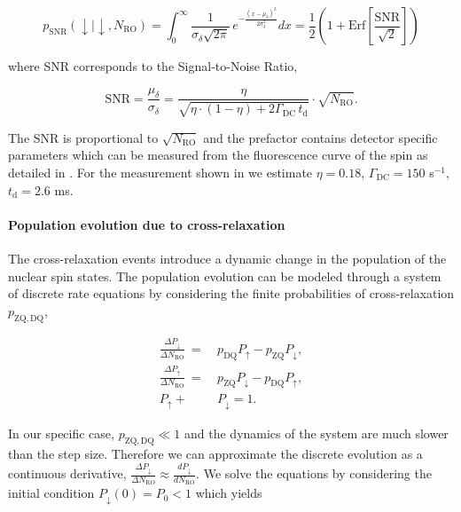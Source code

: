 \begin{equation}
    p_\mathrm{SNR}(\downarrow | \downarrow, N_\mathrm{RO}) = \int_0^\infty \frac{1}{\sigma_\delta \sqrt{2\pi}} \, e^{-\frac{(x - \mu_\delta)^2}{2\sigma^2_\delta}} dx = \frac{1}{2}\left(1 + \text{Erf}\left[\frac{\text{SNR}}{\sqrt{2}}\right]\right)
\end{equation}

where SNR corresponds to the Signal-to-Noise Ratio,

\begin{equation}
    \text{SNR} = \frac{\mu_\delta}{\sigma_\delta} = \frac{\eta}{\sqrt{\eta \cdot (1 - \eta) + 2\Gamma_\mathrm{DC}\, t_\mathrm{d}}} \cdot \sqrt{N_\mathrm{RO}}.
\end{equation}

The SNR is proportional to $\sqrt{N_\mathrm{RO}}$ and the prefactor contains detector specific parameters which can be measured from the fluorescence curve of the spin as detailed in . For the measurement shown in  we estimate $\eta = 0.18$, $\Gamma_\mathrm{DC} = 150$ s$^{-1}$, $t_\mathrm{d} = 2.6$ ms.

\paragraph{Population evolution due to cross-relaxation}

The cross-relaxation events introduce a dynamic change in the population of the nuclear spin states. The population evolution can be modeled through a system of discrete rate equations by considering the finite probabilities of cross-relaxation $p_\mathrm{ZQ,DQ}$,

\begin{equation}
\begin{split}
    \frac{\Delta P_\downarrow}{\Delta N_\mathrm{RO}} \: = \: &p_\text{DQ} P_\uparrow - p_\text{ZQ} P_\downarrow, \\
    \frac{\Delta P_\uparrow}{\Delta N_\mathrm{RO}}  \: = \: &p_\text{ZQ} P_\downarrow - p_\text{DQ} P_\uparrow, \\
    P_\uparrow + &P_\downarrow = 1.
\end{split}
\end{equation}

In our specific case, $p_\mathrm{ZQ,DQ} \ll 1$ and the dynamics of the system are much slower than the step size. Therefore we can approximate the discrete evolution as a continuous derivative, $\frac{\Delta P_\downarrow}{\Delta N_\mathrm{RO}} \approx \frac{d P_\downarrow}{d N_\mathrm{RO}}$. We solve the equations by considering the initial condition $P_\downarrow(0) = P_0 < 1$ which yields

